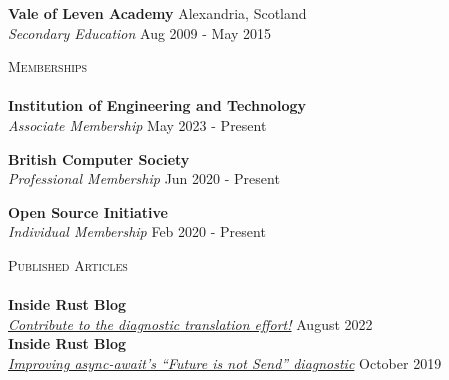 \documentclass[a4paper]{article}
\newcommand{\lineunder} {
  \vspace*{-8pt} \\
  \hspace*{-18pt} \hrulefill \\
}
\newcommand{\header} [1] {
  {\hspace*{-18pt}\vspace*{6pt} \textsc{#1}}
  \vspace*{-6pt} \lineunder
}
\begin{document}
\textbf{Vale of Leven Academy} \hfill {\color{gray} Alexandria, Scotland} \\
\textit{Secondary Education} \hfill {\color{gray} Aug 2009 - May 2015} \\
\vspace{2mm}

\header{Memberships}
\textbf{Institution of Engineering and Technology} \\
\textit{Associate Membership} \hfill {\color{gray} May 2023 - Present} \\
\vspace{2mm}

\textbf{British Computer Society} \\
\textit{Professional Membership} \hfill {\color{gray} Jun 2020 - Present} \\
\vspace{2mm}

\textbf{Open Source Initiative} \\
\textit{Individual Membership} \hfill {\color{gray} Feb 2020 - Present} \\
\vspace{2mm}

\header{Published Articles}
\textbf{Inside Rust Blog} \\
\textit{\href{https://blog.rust-lang.org/inside-rust/2022/08/16/diagnostic-effort.html}{Contribute to the diagnostic translation effort!}} \hfill {\color{gray} August 2022} \\
\textbf{Inside Rust Blog} \\
\textit{\href{https://blog.rust-lang.org/inside-rust/2019/10/11/AsyncAwait-Not-Send-Error-Improvements.html}{Improving async-await's ``Future is not Send'' diagnostic}} \hfill {\color{gray} October 2019} \\
\vspace{2mm}

\end{document}
